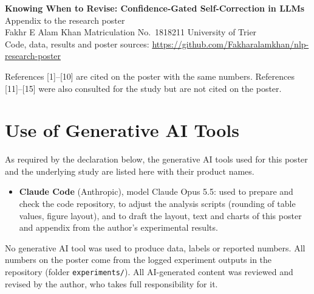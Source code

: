 \documentclass[11pt,a4paper]{article}
\begin{document}
\begin{center}
{\Large\bfseries Knowing When to Revise: Confidence-Gated Self-Correction in LLMs}\\[2mm]
{\large Appendix to the research poster}\\[2mm]
Fakhr E Alam Khan \quad Matriculation No.\ 1818211 \quad University of Trier\\[1mm]
Code, data, results and poster sources: \url{https://github.com/Fakharalamkhan/nlp-research-poster}
\end{center}

\noindent References [1]--[10] are cited on the poster with the same numbers. References [11]--[15] were
also consulted for the study but are not cited on the poster.

\nocite{huang2024cannot}          %
\nocite{kamoi2024when}            %
\nocite{li2024confidence}         %
\nocite{yang2024confidence}       %
\nocite{kadavath2022language}     %
\nocite{wang2023selfconsistency}  %
\nocite{cobbe2021gsm8k}           %
\nocite{yang2018hotpotqa}         %
\nocite{qwen2025qwen25}           %
\nocite{kwon2023vllm}             %
\nocite{madaan2023selfrefine}     %
\nocite{shinn2023reflexion}       %
\nocite{stechly2023gpt4}          %
\nocite{xiong2024can}             %
\nocite{fawcett2006roc}           %




\section*{Use of Generative AI Tools}
As required by the declaration below, the generative AI tools used for this poster and the
underlying study are listed here with their product names.

\begin{itemize}
  \item \textbf{Claude Code} (Anthropic), model Claude Opus 5.5: used to prepare and check the code
  repository, to adjust the analysis scripts (rounding of table values, figure layout), and to draft
  the layout, text and charts of this poster and appendix from the author's experimental results.
\end{itemize}

\noindent No generative AI tool was used to produce data, labels or reported numbers. All numbers on
the poster come from the logged experiment outputs in the repository (folder \texttt{experiments/}). All AI-generated content was
reviewed and revised by the author, who takes full responsibility for it.

\clearpage
\providecommand{\declfile}{declaration/declaration_prefilled.pdf}

\end{document}
